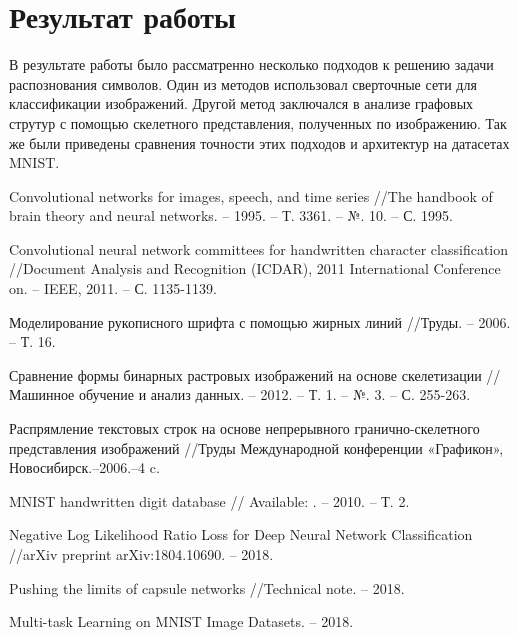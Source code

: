 \documentclass{llncs}
\begin{document}
\section{Результат работы}
В результате работы было рассматренно несколько подходов к решению задачи распознования символов. Один из методов использовал сверточные сети для классификации изображений. Другой метод заключался в анализе графовых струтур с помощью скелетного представления, полученных по изображению. Так же были приведены сравнения точности этих подходов и архитектур на датасетах MNIST.

\begin{thebibliography}{1}

	 Convolutional networks for images, speech, and time series //The handbook of brain theory and neural networks. – 1995. – Т. 3361. – №. 10. – С. 1995.
	 
 	Convolutional neural network committees for handwritten character classification //Document Analysis and Recognition (ICDAR), 2011 International Conference on. – IEEE, 2011. – С. 1135-1139.
 
	 Моделирование рукописного шрифта с помощью жирных линий //Труды. – 2006. – Т. 16.

	 Сравнение формы бинарных растровых изображений на основе скелетизации //Машинное обучение и анализ данных. – 2012. – Т. 1. – №. 3. – С. 255-263.
	 
	 Распрямление текстовых строк на основе непрерывного гранично-скелетного представления изображений //Труды Международной конференции «Графикон», Новосибирск.–2006.–4 c.

	MNIST handwritten digit database //
	Available: 
	 . – 2010. – Т. 2.

	 Negative Log Likelihood Ratio Loss for Deep Neural Network Classification //arXiv preprint arXiv:1804.10690. – 2018.
	 
	Pushing the limits of capsule networks //Technical note. – 2018.

	 Multi-task Learning on MNIST Image Datasets. – 2018.

\end{thebibliography}
\end{document}
